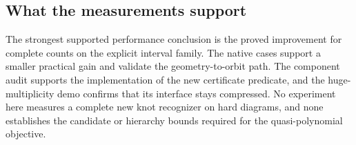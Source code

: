 \subsection{What the measurements support}

The strongest supported performance conclusion is the proved improvement
for complete counts on the explicit interval family.  The native cases
support a smaller practical gain and validate the geometry-to-orbit path.
The component audit supports the implementation of the new certificate
predicate, and the huge-multiplicity demo confirms that its interface stays
compressed.  No experiment here measures a complete new knot recognizer on
hard diagrams, and none establishes the candidate or hierarchy bounds
required for the quasi-polynomial objective.
